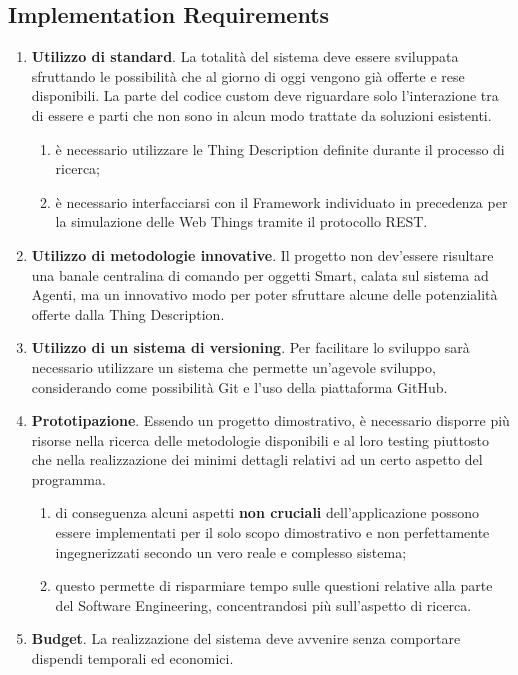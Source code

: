 \documentclass[12pt,a4paper,openright,oneside]{report}
\begin{document}
\subsection{Implementation Requirements}
\begin{enumerate}[label*=\arabic*.]	
	\item \textbf{Utilizzo di standard}. La totalità del sistema deve essere sviluppata sfruttando le possibilità che al giorno di oggi vengono già offerte e rese disponibili. La parte del codice custom deve riguardare solo l'interazione tra di essere e parti che non sono in alcun modo trattate da soluzioni esistenti.
	\begin{enumerate}[label*=\arabic*.]
		\item è necessario utilizzare le Thing Description definite durante il processo di ricerca;
		\item è necessario interfacciarsi con il Framework individuato in precedenza per la simulazione delle Web Things tramite il protocollo REST.
	\end{enumerate}
	
	\item \textbf{Utilizzo di metodologie innovative}. Il progetto non dev'essere risultare una banale centralina di comando per oggetti Smart, calata sul sistema ad Agenti, ma un innovativo modo per poter sfruttare alcune delle potenzialità offerte dalla Thing Description.
	
	\item \textbf{Utilizzo di un sistema di versioning}. Per facilitare lo sviluppo sarà necessario utilizzare un sistema che permette un'agevole sviluppo, considerando come possibilità Git e l'uso della piattaforma GitHub.
	
	\item \textbf{Prototipazione}. Essendo un progetto dimostrativo, è necessario disporre più risorse nella ricerca delle metodologie disponibili e al loro testing piuttosto che nella realizzazione dei minimi dettagli relativi ad un certo aspetto del programma.
	\begin{enumerate}[label*=\arabic*.]
		\item di conseguenza alcuni aspetti \textbf{non cruciali} dell'applicazione possono essere implementati per il solo scopo dimostrativo e non perfettamente ingegnerizzati secondo un vero reale e complesso sistema;
		
		\item questo permette di risparmiare tempo sulle questioni relative alla parte del Software Engineering, concentrandosi più sull'aspetto di ricerca.
	\end{enumerate}
	
	\item \textbf{Budget}. La realizzazione del sistema deve avvenire senza comportare dispendi temporali ed economici.
\end{enumerate}
\end{document}
